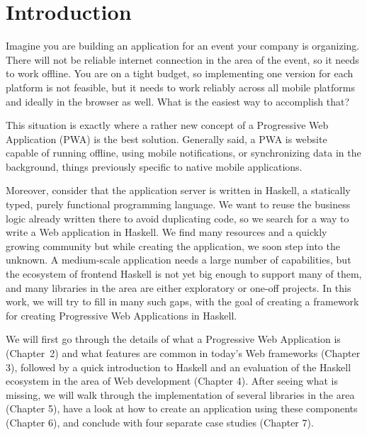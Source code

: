 \documentclass[english,zadani,odsaz]{fitthesis}
\date{\today}
\title{}
\begin{document}
\maketitle
\setlength{\parskip}{0pt}
{\hypersetup{hidelinks}\tableofcontents}
\iftotalfigures\listoffigures\fi
\iftotaltables\listoftables\fi
\iftotallistings\listoflistings\fi
\iftwoside\cleardoublepage\fi
\setlength{\parskip}{0.5\bigskipamount}

\chapter{Introduction}
\label{sec:orgbe06a57}
Imagine you are building an application for an event your company is
organizing. There will not be reliable internet connection in the area of the
event, so it needs to work offline. You are on a tight budget, so implementing
one version for each platform is not feasible, but it needs to work reliably
across all mobile platforms and ideally in the browser as well. What is the
easiest way to accomplish that?

This situation is exactly where a rather new concept of a Progressive Web
Application (PWA) is the best solution. Generally said, a PWA is website
capable of running offline, using mobile notifications, or synchronizing data in
the background, things previously specific to native mobile applications.

Moreover, consider that the application server is written in Haskell, a
statically typed, purely functional programming language. We want to reuse the
business logic already written there to avoid duplicating code, so we search for
a way to write a Web application in Haskell. We find many resources and a
quickly growing community but while creating the application, we soon step into
the unknown. A medium-scale application needs a large number of capabilities,
but the ecosystem of frontend Haskell is not yet big enough to support many of
them, and many libraries in the area are either exploratory or one-off projects.
In this work, we will try to fill in many such gaps, with the goal of creating a
framework for creating Progressive Web Applications in Haskell.

We will first go through the details of what a Progressive Web Application is
(Chapter~2) and what features are common in today's Web frameworks (Chapter 3),
followed by a quick introduction to Haskell and an evaluation of the Haskell
ecosystem in the area of Web development (Chapter 4). After seeing what is
missing, we will walk through the implementation of several libraries in the
area (Chapter 5), have a look at how to create an application using these
components (Chapter 6), and conclude with four separate case studies (Chapter
7).
\end{document}
